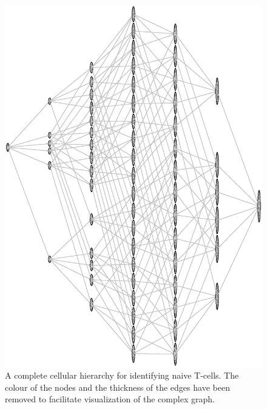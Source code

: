 \begin{landscape}
\begin{figure}[!ht]
  \begin{center}
    \includegraphics[width=13cm, angle=270]{figs/rchy/figs/NaiveOverlapComplete}
  \end{center}
  \caption{A complete cellular hierarchy for identifying naive T-cells. The colour of the nodes and the thickness of the edges have been removed to facilitate visualization of the complex graph.
  }
  \label{r1:NaiveOverlapComplete}
\end{figure}
\end{landscape}

